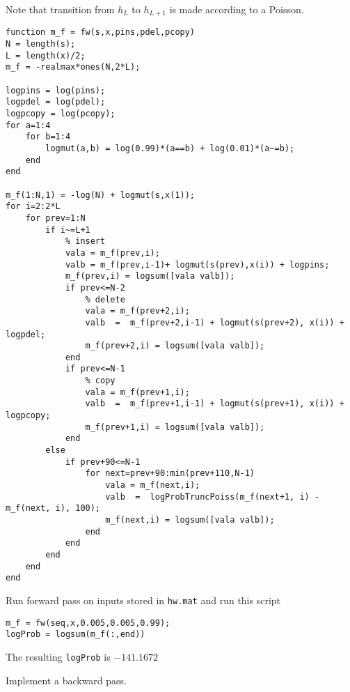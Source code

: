 \documentclass{article}
\begin{document}
Note that transition from $h_{L}$ to $h_{L+1}$ is made according to a Poisson.
\begin{verbatim}
function m_f = fw(s,x,pins,pdel,pcopy)
N = length(s);
L = length(x)/2;
m_f = -realmax*ones(N,2*L);

logpins = log(pins);
logpdel = log(pdel);
logpcopy = log(pcopy);
for a=1:4
    for b=1:4
        logmut(a,b) = log(0.99)*(a==b) + log(0.01)*(a~=b);
    end
end

m_f(1:N,1) = -log(N) + logmut(s,x(1));
for i=2:2*L
    for prev=1:N
        if i~=L+1
            % insert
            vala = m_f(prev,i);
            valb = m_f(prev,i-1)+ logmut(s(prev),x(i)) + logpins;
            m_f(prev,i) = logsum([vala valb]);
            if prev<=N-2
                % delete
                vala = m_f(prev+2,i);
                valb  =  m_f(prev+2,i-1) + logmut(s(prev+2), x(i)) + logpdel;
                m_f(prev+2,i) = logsum([vala valb]);
            end
            if prev<=N-1
                % copy
                vala = m_f(prev+1,i);
                valb  =  m_f(prev+1,i-1) + logmut(s(prev+1), x(i)) + logpcopy;
                m_f(prev+1,i) = logsum([vala valb]);
            end
        else
            if prev+90<=N-1
                for next=prev+90:min(prev+110,N-1)
                    vala = m_f(next,i);
                    valb  =  logProbTruncPoiss(m_f(next+1, i) - m_f(next, i), 100);                                                
                    m_f(next,i) = logsum([vala valb]);
                end
            end
        end
    end
end
\end{verbatim}
Run forward pass on inputs stored in {\tt hw\theHW.mat} and run this script
\begin{verbatim}
m_f = fw(seq,x,0.005,0.005,0.99);
logProb = logsum(m_f(:,end))
\end{verbatim}
The resulting {\tt logProb} is $-141.1672$

\newproblem{3pt} Implement a backward pass.
\end{document}
